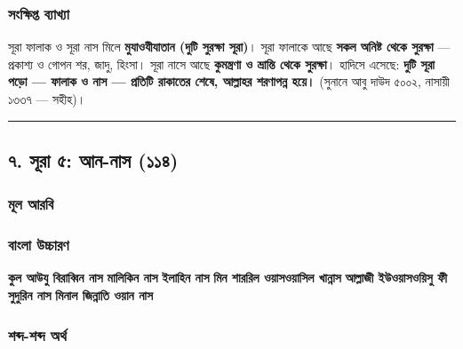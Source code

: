 \subsubsection*{সংক্ষিপ্ত ব্যাখ্যা}
সূরা ফালাক ও সূরা নাস মিলে \textbf{মুযাওযীযাতান (দুটি সুরক্ষা সূরা)}। সূরা ফালাকে আছে \textbf{সকল অনিষ্ট থেকে সুরক্ষা} — প্রকাশ্য ও গোপন শর, জাদু, হিংসা। সূরা নাসে আছে \textbf{কুমন্ত্রণা ও ভ্রান্তি থেকে সুরক্ষা}। হাদিসে এসেছে: \textbf{দুটি সূরা পড়ো — ফালাক ও নাস — প্রতিটি রাকাতের শেষে, আল্লাহর শরণাপন্ন হয়ে।} (সুনানে আবু দাউদ ৫০০২, নাসায়ী ১৩৩৭ — সহীহ)।

\medskip\hrule\medskip

\subsection*{৭. সূরা ৫: আন-নাস (১১৪)}

\subsubsection*{মূল আরবি}
\begin{center}\end{center}
\begin{center}\end{center}
\begin{center}\end{center}
\begin{center}\end{center}
\begin{center}\end{center}
\begin{center}\end{center}

\subsubsection*{বাংলা উচ্চারণ}
\textbf{কুল আউযু বিরাব্বিন নাস}
\textbf{মালিকিন নাস}
\textbf{ইলাহিন নাস}
\textbf{মিন শাররিল ওয়াসওয়াসিল খান্নাস}
\textbf{আল্লাজী ইউওয়াসওয়িসু ফী সুদুরিন নাস}
\textbf{মিনাল জিন্নাতি ওয়ান নাস}

\subsubsection*{শব্দ-শব্দ অর্থ}

